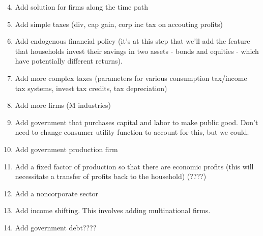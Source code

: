 \documentclass[letterpaper,12pt]{article}
\theoremstyle{definition}
\begin{document}
\begin{enumerate}
\setcounter{enumi}{3}
\item Add solution for firms along the time path
\item Add simple taxes (div, cap gain, corp inc tax on accouting profits)
\item Add endogenous financial policy (it's at this step that we'll add the feature that households invest their savings in two assets - bonds and equities - which have potentially different returns).
\item Add more complex taxes (parameters for various consumption tax/income tax systems, invest tax credits, tax depreciation)
\item Add more firms (M industries)
\item Add government that purchases capital and labor to make public good.  Don't need to change consumer utility function to account for this, but we could.
\item Add government production firm
\item Add a fixed factor of production so that there are economic profits (this will necessitate a transfer of profits back to the household) (????)
\item Add a noncorporate sector
\item Add income shifting.  This involves adding multinational firms.
\item Add government debt????
\end{enumerate}
\end{document}
